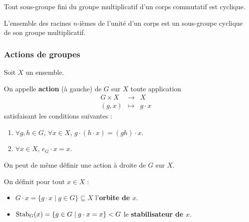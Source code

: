 
  \begin{theorem}
    Tout sous-groupe fini du groupe multiplicatif d'un corps commutatif est cyclique.
  \end{theorem}

  \begin{corollary}
    L'ensemble des racines $n$-ièmes de l'unité d'un corps est un sous-groupe cyclique de son groupe multiplicatif.
  \end{corollary}

  \subsubsection{Actions de groupes}


  Soit $X$ un ensemble.

  \begin{definition}
    On appelle \textbf{action} (à gauche) de $G$ sur $X$ toute application
    \[
    \begin{array}{ccc}
      G \times X &\rightarrow& X \\
      (g, x) &\mapsto& g \cdot x
    \end{array}
    \]
    satisfaisant les conditions suivantes :
    \begin{enumerate}[label={\bfseries(\roman*)}]
      \item $\forall g, h \in G$, $\forall x \in X$, $g \cdot (h \cdot x) = (gh) \cdot x$.
      \item $\forall x \in X$, $e_G \cdot x = x$.
    \end{enumerate}
  \end{definition}

  \begin{remark}
    On peut de même définir une action à droite de $G$ sur $X$.
  \end{remark}

  \begin{definition}
    On définit pour tout $x \in X$ :
    \begin{itemize}
      \item $G \cdot x = \{ g \cdot x \mid g \in G \} \subseteq X$ l'\textbf{orbite de $x$}.
      \item $\operatorname{Stab}_G(x) = \{ g \in G \mid g \cdot x = x \} < G$ le \textbf{stabilisateur de $x$}.
    \end{itemize}
  \end{definition}

